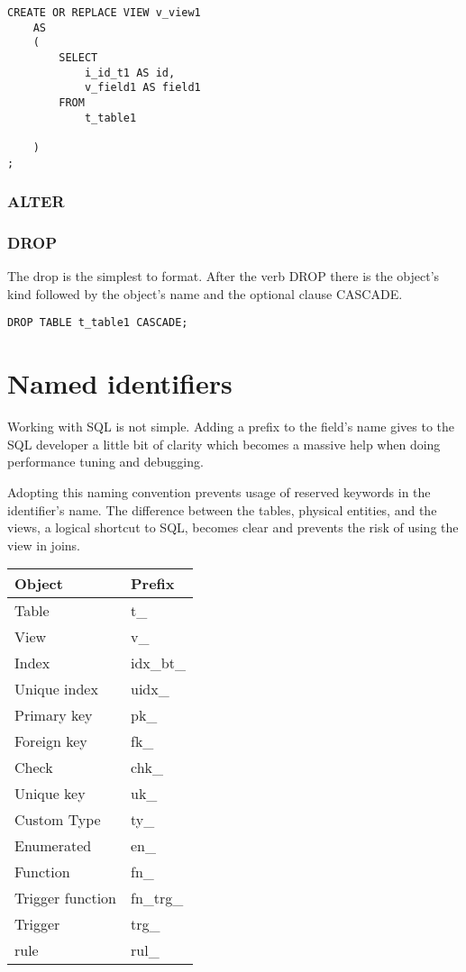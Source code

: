 \begin{lstlisting}[style=pgsql]
CREATE OR REPLACE VIEW v_view1
	AS
	(
		SELECT
			i_id_t1 AS id,
			v_field1 AS field1
		FROM
			t_table1
		
	)
;

\end{lstlisting}


\subsubsection{ALTER}


\subsubsection{DROP}
The drop is the simplest to format. After the verb DROP there is the object's kind followed by the object's 
name and the optional clause CASCADE.

\begin{lstlisting}[style=pgsql]
DROP TABLE t_table1 CASCADE;
\end{lstlisting}


\section{Named identifiers}
Working with SQL is not simple.  Adding a prefix to the field's name gives to the SQL developer a little bit of 
clarity which becomes a massive help when doing performance tuning and debugging.\newline 

Adopting this naming convention prevents usage of reserved keywords in the identifier's name. The difference between 
the tables, physical entities, and the views, a logical shortcut to SQL, becomes clear and prevents the risk of 
using the view in joins. \newline



\begin{table}[H]
\begin{tabular}{ll}
 \textbf{Object} & \textbf{Prefix}  \\
 \hline
 Table & t\_ \\
 View & v\_ \\
Index & idx\_bt\_ \\
Unique index & uidx\_ \\
Primary key & pk\_ \\
Foreign key & fk\_ \\
Check & chk\_ \\
Unique key & uk\_ \\
Custom Type & ty\_ \\
Enumerated & en\_ \\
Function & fn\_ \\
Trigger function & fn\_trg\_ \\
Trigger & trg\_ \\
rule & rul\_ \\

\end{tabular}
\end{table}

